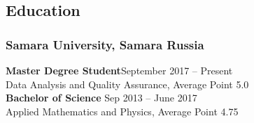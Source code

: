 \subsection*{Education}
    \subsubsection*{Samara University, Samara Russia}
    \textbf{Master Degree Student}\hfill \hfill September 2017 -- Present\\
    Data Analysis and Quality Assurance, Average Point 5.0\\
    \textbf{Bachelor of Science} \hfill Sep 2013 -- June 2017\\
    Applied Mathematics and Physics, Average Point 4.75
